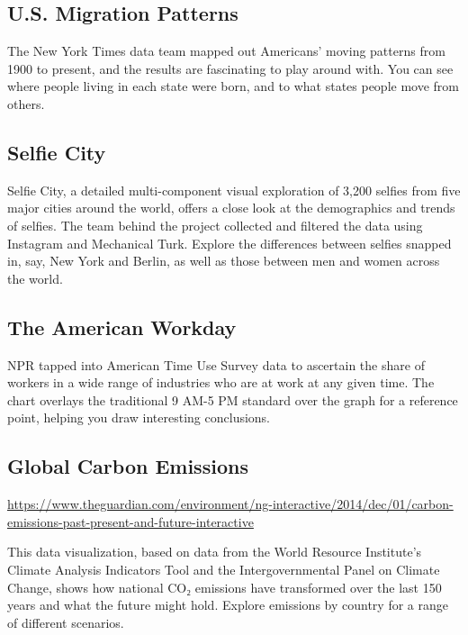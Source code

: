 \documentclass[]{book}
\theoremstyle{definition}
\theoremstyle{definition}
\theoremstyle{definition}
\theoremstyle{remark}
\begin{document}
\subsection{U.S. Migration Patterns}\label{u.s.-migration-patterns}

\citep{migration}

The New York Times data team mapped out Americans' moving patterns from
1900 to present, and the results are fascinating to play around with.
You can see where people living in each state were born, and to what
states people move from others.

\subsection{Selfie City}\label{selfie-city}

\citep{selfie}

Selfie City, a detailed multi-component visual exploration of 3,200
selfies from five major cities around the world, offers a close look at
the demographics and trends of selfies. The team behind the project
collected and filtered the data using Instagram and Mechanical Turk.
Explore the differences between selfies snapped in, say, New York and
Berlin, as well as those between men and women across the world.

\subsection{The American Workday}\label{the-american-workday}

NPR tapped into American Time Use Survey data to ascertain the share of
workers in a wide range of industries who are at work at any given time.
The chart overlays the traditional 9 AM-5 PM standard over the graph for
a reference point, helping you draw interesting conclusions.

\subsection{Global Carbon Emissions}\label{global-carbon-emissions}

\citep{CO2_emission}
\url{https://www.theguardian.com/environment/ng-interactive/2014/dec/01/carbon-emissions-past-present-and-future-interactive}

This data visualization, based on data from the World Resource
Institute's Climate Analysis Indicators Tool and the Intergovernmental
Panel on Climate Change, shows how national CO₂ emissions have
transformed over the last 150 years and what the future might hold.
Explore emissions by country for a range of different scenarios.
\end{document}
